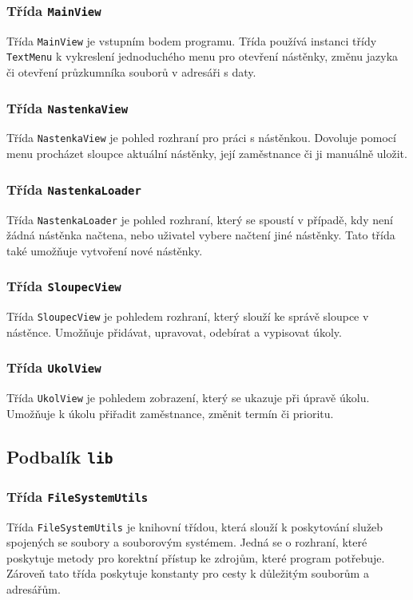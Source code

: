 \documentclass[FM,DP]{tulthesis}
\begin{document}
\subsubsection{Třída \texttt{MainView}}
Třída \texttt{MainView} je vstupním bodem programu. Třída používá instanci třídy \texttt{TextMenu} k vykreslení jednoduchého menu pro otevření nástěnky, změnu jazyka či otevření průzkumníka souborů v adresáři s daty.

\subsubsection{Třída \texttt{NastenkaView}}
Třída \texttt{NastenkaView} je pohled rozhraní pro práci s nástěnkou. Dovoluje pomocí menu procházet sloupce aktuální nástěnky, její zaměstnance či ji manuálně uložit.

\subsubsection{Třída \texttt{NastenkaLoader}}
Třída \texttt{NastenkaLoader} je pohled rozhraní, který se spoustí v případě, kdy není žádná nástěnka načtena, nebo uživatel vybere načtení jiné nástěnky. Tato třída také umožňuje vytvoření nové nástěnky.

\subsubsection{Třída \texttt{SloupecView}}
Třída \texttt{SloupecView} je pohledem rozhraní, který slouží ke správě sloupce v nástěnce. Umožňuje přidávat, upravovat, odebírat a vypisovat úkoly. 

\subsubsection{Třída \texttt{UkolView}}
Třída \texttt{UkolView} je pohledem zobrazení, který se ukazuje při úpravě úkolu. Umožňuje k úkolu přiřadit zaměstnance, změnit termín či prioritu.

\subsection{Podbalík \texttt{lib}}

\subsubsection{Třída \texttt{FileSystemUtils}}
Třída \texttt{FileSystemUtils} je knihovní třídou, která slouží k poskytování služeb spojených se soubory a souborovým systémem. Jedná se o rozhraní, které poskytuje metody pro korektní přístup ke zdrojům, které program potřebuje. Zároveň tato třída poskytuje konstanty pro cesty k důležitým souborům a adresářům.
\end{document}

